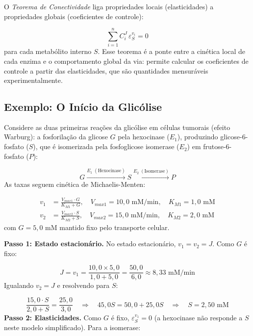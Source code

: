 O \emph{Teorema de Conectividade} liga propriedades locais (elasticidades) a propriedades
globais (coeficientes de controle):

\begin{equation}
\sum_{i=1}^{n} C_i^J \, \varepsilon_S^{v_i} = 0
\end{equation}
para cada metabólito interno $S$. Esse teorema é a ponte entre a cinética local de cada
enzima e o comportamento global da via: permite calcular os coeficientes de controle
a partir das elasticidades, que são quantidades mensuráveis experimentalmente.

\subsection{Exemplo: O Início da Glicólise}

Considere as duas primeiras reações da glicólise em células tumorais (efeito Warburg):
a fosforilação da glicose $G$ pela hexocinase ($E_1$), produzindo glicose-6-fosfato ($S$),
que é isomerizada pela fosfoglicose isomerase ($E_2$) em frutose-6-fosfato ($P$):

\begin{equation*}
G \xrightarrow{E_1 \; (\text{Hexocinase})} S \xrightarrow{E_2 \; (\text{Isomerase})} P
\end{equation*}
As taxas seguem cinética de Michaelis-Menten:

\begin{align*}
v_1 &= \frac{V_{max1} \cdot G}{K_{M1} + G}, \quad V_{max1} = 10{,}0 \text{ mM/min}, \quad K_{M1} = 1{,}0 \text{ mM} \\
v_2 &= \frac{V_{max2} \cdot S}{K_{M2} + S}, \quad V_{max2} = 15{,}0 \text{ mM/min}, \quad K_{M2} = 2{,}0 \text{ mM}
\end{align*}
com $G = 5{,}0$ mM mantido fixo pelo transporte celular.

\textbf{Passo 1: Estado estacionário.} No estado estacionário, $v_1 = v_2 = J$. Como $G$ é fixo:

\begin{equation*}
J = v_1 = \frac{10{,}0 \times 5{,}0}{1{,}0 + 5{,}0} = \frac{50{,}0}{6{,}0} \approx 8{,}33 \text{ mM/min}
\end{equation*}
Igualando $v_2 = J$ e resolvendo para $S$:

\begin{equation*}
\frac{15{,}0 \cdot S}{2{,}0 + S} = \frac{25{,}0}{3{,}0} \quad \Rightarrow \quad 45{,}0 S = 50{,}0 + 25{,}0 S \quad \Rightarrow \quad S = 2{,}50 \text{ mM}
\end{equation*}
\textbf{Passo 2: Elasticidades.} Como $G$ é fixo, $\varepsilon_S^{v_1} = 0$ (a hexocinase
não responde a $S$ neste modelo simplificado). Para a isomerase:

